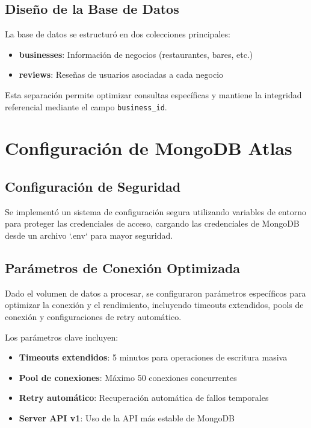 \documentclass[12pt,a4paper,twoside,openany]{book}
\begin{document}
\subsection{Diseño de la Base de Datos}

La base de datos se estructuró en dos colecciones principales:

\begin{itemize}
    \item \textbf{businesses}: Información de negocios (restaurantes, bares, etc.)
    \item \textbf{reviews}: Reseñas de usuarios asociadas a cada negocio
\end{itemize}

Esta separación permite optimizar consultas específicas y mantiene la integridad referencial mediante el campo \texttt{business\_id}.

\section{Configuración de MongoDB Atlas}

\subsection{Configuración de Seguridad}

Se implementó un sistema de configuración segura utilizando variables de entorno para proteger las credenciales de acceso, cargando las credenciales de MongoDB desde un archivo `.env` para mayor seguridad.

\subsection{Parámetros de Conexión Optimizada}

Dado el volumen de datos a procesar, se configuraron parámetros específicos para optimizar la conexión y el rendimiento, incluyendo timeouts extendidos, pools de conexión y configuraciones de retry automático.

Los parámetros clave incluyen:

\begin{itemize}
    \item \textbf{Timeouts extendidos}: 5 minutos para operaciones de escritura masiva
    \item \textbf{Pool de conexiones}: Máximo 50 conexiones concurrentes
    \item \textbf{Retry automático}: Recuperación automática de fallos temporales
    \item \textbf{Server API v1}: Uso de la API más estable de MongoDB
\end{itemize}
\end{document}
